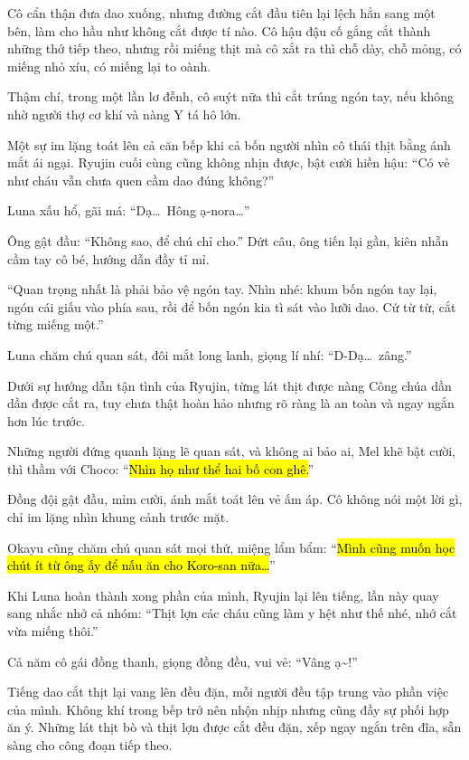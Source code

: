 \documentclass[../main.tex]{subfiles}
\begin{document}
Cô cẩn thận đưa dao xuống, nhưng đường cắt đầu tiên lại lệch hẳn sang một bên, làm cho hầu như không cắt được tí nào. Cô hậu đậu cố gắng cắt thành những thớ tiếp theo, nhưng rồi miếng thịt mà cô xắt ra thì chỗ dày, chỗ mỏng, có miếng nhỏ xíu, có miếng lại to oành.

Thậm chí, trong một lần lơ đễnh, cô suýt nữa thì cắt trúng ngón tay, nếu không nhờ người thợ cơ khí và nàng Y tá hô lớn.

Một sự im lặng toát lên cả căn bếp khi cả bốn người nhìn cô thái thịt bằng ánh mắt ái ngại. Ryujin cuối cùng cũng không nhịn được, bật cười hiền hậu: ``Có vẻ như cháu vẫn chưa quen cầm dao đúng không?''

Luna xấu hổ, gãi má: ``Dạ\dots\ Hông ạ-nora\dots''

Ông gật đầu: ``Không sao, để chú chỉ cho.'' Dứt câu, ông tiến lại gần, kiên nhẫn cầm tay cô bé, hướng dẫn đầy tỉ mỉ.

``Quan trọng nhất là phải bảo vệ ngón tay. Nhìn nhé: khum bốn ngón tay lại, ngón cái giấu vào phía sau, rồi để bốn ngón kia tì sát vào lưỡi dao. Cứ từ từ, cắt từng miếng một.''

Luna chăm chú quan sát, đôi mắt long lanh, giọng lí nhí: ``D-Dạ\dots\ zâng.''

Dưới sự hướng dẫn tận tình của Ryujin, từng lát thịt được nàng Công chúa dần dần được cắt ra, tuy chưa thật hoàn hảo nhưng rõ ràng là an toàn và ngay ngắn hơn lúc trước.

Những người đứng quanh lặng lẽ quan sát, và không ai bảo ai, Mel khẽ bật cười, thì thầm với Choco: ``\hl{Nhìn họ như thể hai bố con ghê.}''

Đồng đội gật đầu, mỉm cười, ánh mắt toát lên vẻ ấm áp. Cô không nói một lời gì, chỉ im lặng nhìn khung cảnh trước mặt.

Okayu cũng chăm chú quan sát mọi thứ, miệng lẩm bẩm: ``\hl{Mình cũng muốn học chút ít từ ông ấy để nấu ăn cho Koro-san nữa\dots}''

Khi Luna hoàn thành xong phần của mình, Ryujin lại lên tiếng, lần này quay sang nhắc nhở cả nhóm: ``Thịt lợn các cháu cũng làm y hệt như thế nhé, nhớ cắt vừa miếng thôi.''

Cả năm cô gái đồng thanh, giọng đồng đều, vui vẻ: ``Vâng ạ\~{}!''

Tiếng dao cắt thịt lại vang lên đều đặn, mỗi người đều tập trung vào phần việc của mình. Không khí trong bếp trở nên nhộn nhịp nhưng cũng đầy sự phối hợp ăn ý. Những lát thịt bò và thịt lợn được cắt đều đặn, xếp ngay ngắn trên đĩa, sẵn sàng cho công đoạn tiếp theo.
\end{document}
